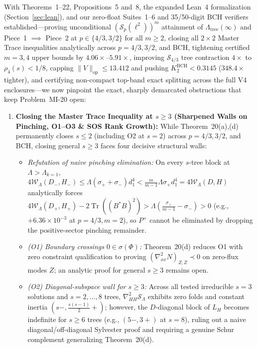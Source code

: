 \documentclass[10pt,letterpaper]{article}
\newcommand{\Sp}{\mathcal{S}_p}
\newcommand{\Tr}{\operatorname{Tr}}
\newcommand{\op}{\mathrm{op}}
\begin{document}
With Theorems~1--22, Propositions~5 and~8, the expanded Lean~4 formalization (Section~\ref{sec:lean}), and our zero-float Suites~1--6 and 35/50-digit BCH verifiers established—proving unconditional $(\Sp(\ell^2))^m$ attainment of $\Lambda_{\mathrm{tree}}(\infty)$ and Piece~1 $\implies$ Piece~2 at $p \in \{4/3, 3/2\}$ for all $m \ge 2$, closing all $2\times 2$ Master Trace inequalities analytically across $p = 4/3, 3/2$, and BCH, tightening certified $m = 3, 4$ upper bounds by $4.06\times$--$5.91\times$, improving $\mathcal{S}_{4/3}$ tree contraction $4\times$ to $\rho_4(s) < 1/8$, capping $\|V\|_{\op} \le 13.412$ and pushing $K_2^{\mathrm{BCH}} < 0.3145$ ($348.4\times$ tighter), and certifying non-compact top-band exact splitting across the full V4 enclosures—we now pinpoint the exact, sharply demarcated obstructions that keep Problem~MI-20 open:
\begin{enumerate}[leftmargin=1.6em,itemsep=3pt]
  \item \textbf{Closing the Master Trace Inequality at $s \ge 3$ (Sharpened Walls on Pinching, O1--O3 \& SOS Rank Growth):} While Theorem~20(a),(d) permanently closes $s \le 2$ (including O2 at $s = 2$) across $p = 4/3, 3/2$, and BCH, closing general $s \ge 3$ faces four decisive structural walls:
  \begin{itemize}[leftmargin=1.4em,itemsep=1.5pt]
    \item \emph{Refutation of naive pinching elimination:} On every $s$-tree block at $\Lambda > \Lambda_{k=1}$, $4\mathcal{W}_\Lambda(D_-, H_-) \le \Lambda(\sigma_+ + \sigma_-)d_1^4 < \frac{m}{m-1}\Lambda\sigma_+ d_1^4 = 4\mathcal{W}_\Lambda(D, H)$ analytically forces $4\mathcal{W}_\Lambda(D_+, H_+) - 2\Tr((B^*B)^2) > \Lambda(\frac{\sigma_+}{m-1} - \sigma_-) > 0$ (e.g., $+6.36\times 10^{-3}$ at $p = 4/3, m = 2$), so $P^+$ cannot be eliminated by dropping the positive-sector pinching remainder.
    \item \emph{(O1) Boundary crossings $0 \in \sigma(\Phi)$:} Theorem~20(d) reduces O1 with zero constraint qualification to proving $(\nabla^2_{xx} N)_{Z,Z} \prec 0$ on zero-flux modes $Z$; an analytic proof for general $s \ge 3$ remains open.
    \item \emph{(O2) Diagonal-subspace wall for $s \ge 3$:} Across all tested irreducible $s = 3$ solutions and $s = 2,\dots,8$ trees, $\nabla^2_{HH}\mathcal{S}_\Lambda$ exhibits zero folds and constant inertia $(s-, \frac{s(s-1)}{2}+)$; however, the $D$-diagonal block of $L_H$ becomes indefinite for $s \ge 6$ trees (e.g., $(5-, 3+)$ at $s = 8$), ruling out a naive diagonal/off-diagonal Sylvester proof and requiring a genuine Schur complement generalizing Theorem~20(d).

\end{itemize}
\end{enumerate}
\end{document}
